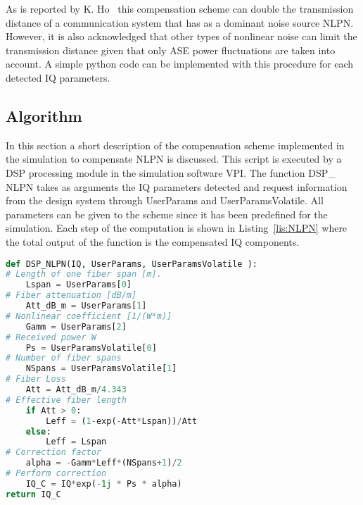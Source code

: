 \begin{figure}[H]
                                                                                                                                                                                                                                                                                                                                                                                                                                                                                                                                                                 
  \label{fig:NLPNvis}
\end{figure}

As is reported by K. Ho~\cite{NLPNDSP} this compensation scheme can double the transmission distance of a communication system that has as a dominant noise source NLPN. However, it is also acknowledged that other types of nonlinear noise can limit the transmission distance given that only ASE power fluctuations are taken into account. A simple python code can be implemented with this procedure for each detected IQ parameters.

\subsection{Algorithm}

In this section a short description of the compensation scheme implemented in the simulation to compensate NLPN is discussed. This script is executed by a DSP processing module in the simulation software VPI. The function DSP\_ NLPN takes as arguments the IQ parameters detected and request information from the design system through UserParams and UserParamsVolatile. All parameters can be given to the scheme since it has been predefined for the simulation. Each step of the computation is shown in Listing~\ref{lis:NLPN} where the total output of the function is the compensated IQ components. ~\\
 
\begin{lstlisting}[language=Python, caption= 	Python implementation of a analytically derived compensation scheme to mitigate NLPN. ,label=lis:NLPN]
def DSP_NLPN(IQ, UserParams, UserParamsVolatile ):
# Length of one fiber span [m].
	Lspan = UserParams[0]
# Fiber attenuation [dB/m]
	Att_dB_m = UserParams[1]
# Nonlinear coefficient [1/(W*m)]
	Gamm = UserParams[2]
# Received power W
	Ps = UserParamsVolatile[0]
# Number of fiber spans
	NSpans = UserParamsVolatile[1]
# Fiber Loss
	Att = Att_dB_m/4.343
# Effective fiber length
	if Att > 0:
		Leff = (1-exp(-Att*Lspan))/Att
	else:
		Leff = Lspan
# Correction factor
	alpha = -Gamm*Leff*(NSpans+1)/2
# Perform correction
	IQ_C = IQ*exp(-1j * Ps * alpha)
return IQ_C
\end{lstlisting}

